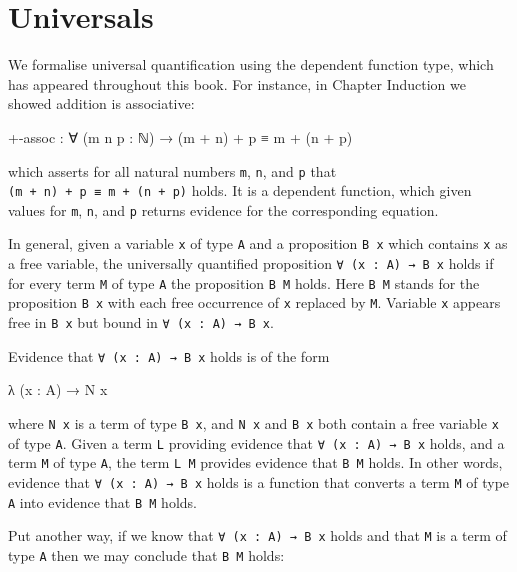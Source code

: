 \hypertarget{universals}{%
\section{Universals}\label{universals}}

We formalise universal quantification using the dependent function type,
which has appeared throughout this book. For instance, in Chapter
Induction we showed addition is associative:

\begin{myDisplay}
+-assoc : ∀ (m n p : ℕ) → (m + n) + p ≡ m + (n + p)
\end{myDisplay}

which asserts for all natural numbers \texttt{m}, \texttt{n}, and
\texttt{p} that \texttt{(m\ +\ n)\ +\ p\ ≡\ m\ +\ (n\ +\ p)} holds. It
is a dependent function, which given values for \texttt{m}, \texttt{n},
and \texttt{p} returns evidence for the corresponding equation.

In general, given a variable \texttt{x} of type \texttt{A} and a
proposition \texttt{B\ x} which contains \texttt{x} as a free variable,
the universally quantified proposition \texttt{∀\ (x\ :\ A)\ →\ B\ x}
holds if for every term \texttt{M} of type \texttt{A} the proposition
\texttt{B\ M} holds. Here \texttt{B\ M} stands for the proposition
\texttt{B\ x} with each free occurrence of \texttt{x} replaced by
\texttt{M}. Variable \texttt{x} appears free in \texttt{B\ x} but bound
in \texttt{∀\ (x\ :\ A)\ →\ B\ x}.

Evidence that \texttt{∀\ (x\ :\ A)\ →\ B\ x} holds is of the form

\begin{myDisplay}
λ (x : A) → N x
\end{myDisplay}

where \texttt{N\ x} is a term of type \texttt{B\ x}, and \texttt{N\ x}
and \texttt{B\ x} both contain a free variable \texttt{x} of type
\texttt{A}. Given a term \texttt{L} providing evidence that
\texttt{∀\ (x\ :\ A)\ →\ B\ x} holds, and a term \texttt{M} of type
\texttt{A}, the term \texttt{L\ M} provides evidence that \texttt{B\ M}
holds. In other words, evidence that \texttt{∀\ (x\ :\ A)\ →\ B\ x}
holds is a function that converts a term \texttt{M} of type \texttt{A}
into evidence that \texttt{B\ M} holds.

Put another way, if we know that \texttt{∀\ (x\ :\ A)\ →\ B\ x} holds
and that \texttt{M} is a term of type \texttt{A} then we may conclude
that \texttt{B\ M} holds:

